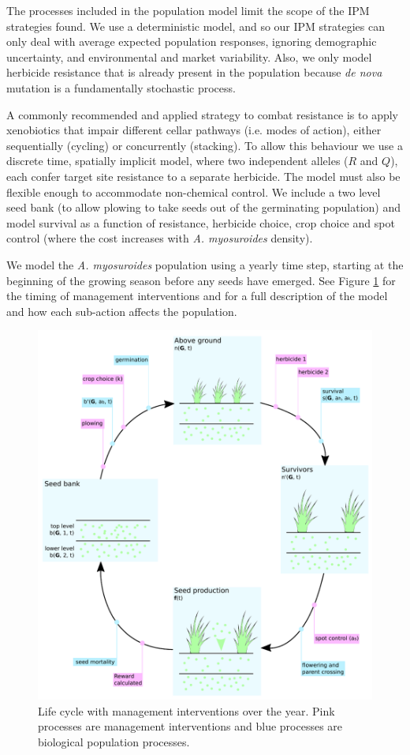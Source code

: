 \documentclass[12pt, a4paper]{article}
\begin{document}
The processes included in the population model limit the scope of the IPM strategies found. We use a deterministic model, and so our IPM strategies can only deal with average expected population responses, ignoring demographic uncertainty, and environmental and market variability. Also, we only model herbicide resistance that is already present in the population because \textit{de nova} mutation is a fundamentally stochastic process. 

A commonly recommended \citep{REX2013} and applied \citep{Hick2018} strategy to combat resistance is to apply xenobiotics that impair different cellar pathways (i.e. modes of action), either sequentially (cycling) or concurrently (stacking). To allow this behaviour we use a discrete time, spatially implicit model, where two independent alleles ($R$ and $Q$), each confer target site resistance to a separate herbicide. The model must also be flexible enough to accommodate non-chemical control. We include a two level seed bank (to allow plowing to take seeds out of the germinating population) and model survival as a function of resistance, herbicide choice, crop choice and spot control (where the cost increases with \textit{A. myosuroides} density).

We model the \textit{A. myosuroides} population using a yearly time step, starting at the beginning of the growing season before any seeds have emerged. See Figure \ref{fig:life_cyc} for the timing of management interventions and  for a full description of the model and how each sub-action affects the population. 

\begin{figure}[!ht]
\includegraphics[scale=0.5]{MS_figs/pop_mod_2sb_scheme.pdf}
\caption{Life cycle with management interventions over the year. Pink processes are management interventions and blue processes are biological population processes.}
\label{fig:life_cyc}
\end{figure} 
\end{document}
